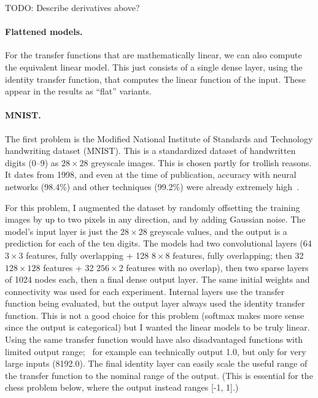 \documentclass[twocolumn]{article}
\newcommand\xbyx[2]{\ensuremath{#1 {\times} #2}}
\begin{document}
TODO: Describe derivatives above?

\paragraph{Flattened models.}
For the transfer functions that are mathematically linear, we can also
compute the equivalent linear model. This just consists of a single
dense layer, using the identity transfer function, that computes the
linear function of the input. These appear in the results as ``flat''
variants.

\paragraph{MNIST.}
The first problem is the Modified National Institute of Standards and
Technology handwriting dataset (MNIST). This is a standardized dataset
of handwritten digits (0–9) as \xbyx{28}{28} greyscale images. This is chosen
partly for trollish reasons. It dates from 1998, and even at the time
of publication, accuracy with neural networks (98.4\%) and other
techniques (99.2\%) were already extremely high~\cite{lecun1998gradient}.

For this problem, I augmented the dataset by randomly offsetting the
training images by up to two pixels in any direction, and by adding
Gaussian noise. The model's input layer is just the $28 \times 28$
greyscale values, and the output is a prediction for each of the ten
digits. The models had two convolutional layers (64 \xbyx{3}{3} features,
fully overlapping + 128 \xbyx{8}{8} features, fully overlapping; then
32 \xbyx{128}{128} features + 32 \xbyx{256}{2} features with no
overlap), then two sparse layers of 1024 nodes each, then a final
dense output layer. The same initial weights and connectivity was used
for each experiment. Internal layers use the transfer function being
evaluated, but the output layer always used the identity transfer
function. This is not a good choice for this problem (softmax makes
more sense since the output is categorical) but I wanted the linear
models to be truly linear. Using the same transfer function would have
also disadvantaged functions with limited output range; \downshifttwo\
for example can technically output 1.0, but only for very large inputs
(8192.0). The final identity layer can easily scale the useful range
of the transfer function to the nominal range of the output. (This is
essential for the chess problem below, where the output instead ranges
[-1, 1].)
\end{document}
